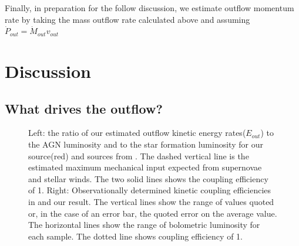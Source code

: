 	Finally, in preparation for the follow discussion, we estimate outflow momentum rate by taking the mass outflow rate calculated above and assuming $\dot{P}_{out}=\dot{M}_{out}v_{out}$

\section{Discussion}
\label{sec:discussion}
\subsection{What drives the outflow?}
\begin{figure}[htp]
		\centering
		\label{coupeffic}
		\caption{Left: the ratio of our estimated outflow kinetic energy rates($E_{out}$) to the AGN luminosity and to the star formation luminosity for our source(red) and sources from \cite{harrison2014kiloparsec}. The dashed vertical line is the estimated maximum mechanical input expected from supernovae and stellar winds. The two solid lines shows the coupling efficiency of 1. Right: Observationally determined kinetic coupling efficiencies in \cite{harrison2018agn} and our result. The vertical lines show the range of values quoted or, in the case of an error bar, the quoted error on the average value. The horizontal lines show the range of bolometric luminosity for each sample. The dotted line shows coupling efficiency of 1. }
	\end{figure}
	
